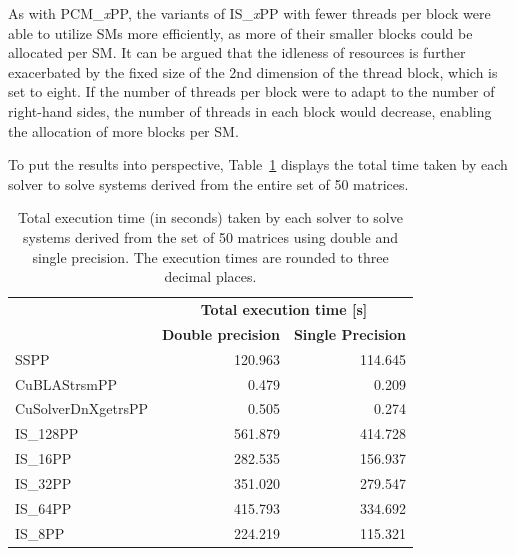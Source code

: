 As with PCM\_\textit{x}PP, the variants of IS\_\textit{x}PP with fewer threads per block were able to utilize SMs more efficiently, as more of their smaller blocks could be allocated per SM. It can be argued that the idleness of resources is further exacerbated by the fixed size of the 2nd dimension of the thread block, which is set to eight. If the number of threads per block were to adapt to the number of right-hand sides, the number of threads in each block would decrease, enabling the allocation of more blocks per SM.

To put the results into perspective, Table~\ref{Table:comparing-decomposers-and-solvers->decomposition-project-benchmarks->solvers-benchmark->comparison-of-execution-times-on-all-matrices->total-execution-time-of-solvers-on-set-of-50-matrices} displays the total time taken by each solver to solve systems derived from the entire set of 50 matrices.

\begin{table}[ht!]
	\centering
	\begin{tabular}{|l|r|r|}
		\hline
		\rowcolor[HTML]{C0C0C0} 
		\multicolumn{1}{|c|}{\cellcolor[HTML]{C0C0C0}}                                      & \multicolumn{2}{c|}{\cellcolor[HTML]{C0C0C0}\textbf{Total execution time {[}s{]}}}                                                                        \\ \cline{2-3} 
		\rowcolor[HTML]{EFEFEF} 
		\multicolumn{1}{|c|}{\multirow{-2}{*}{\cellcolor[HTML]{C0C0C0}\textbf{Solver}}} & \multicolumn{1}{l|}{\cellcolor[HTML]{EFEFEF}\textbf{Double precision}} & \multicolumn{1}{l|}{\cellcolor[HTML]{EFEFEF}\textbf{Single Precision}} \\ \hline
		\multicolumn{1}{|l|}{SSPP}               & 120.963 & 114.645 \\
		\multicolumn{1}{|l|}{CuBLAStrsmPP}       &   0.479 &   0.209 \\
		\multicolumn{1}{|l|}{CuSolverDnXgetrsPP} &   0.505 &   0.274 \\
		\multicolumn{1}{|l|}{IS\_128PP}          & 561.879 & 414.728 \\
		\multicolumn{1}{|l|}{IS\_16PP}           & 282.535 & 156.937 \\
		\multicolumn{1}{|l|}{IS\_32PP}           & 351.020 & 279.547 \\
		\multicolumn{1}{|l|}{IS\_64PP}           & 415.793 & 334.692 \\
		\multicolumn{1}{|l|}{IS\_8PP}            & 224.219 & 115.321 \\ \hline
	\end{tabular}
	\caption{Total execution time (in seconds) taken by each solver to solve systems derived from the set of 50 matrices using double and single precision. The execution times are rounded to three decimal places.}
	\label{Table:comparing-decomposers-and-solvers->decomposition-project-benchmarks->solvers-benchmark->comparison-of-execution-times-on-all-matrices->total-execution-time-of-solvers-on-set-of-50-matrices}
\end{table}

